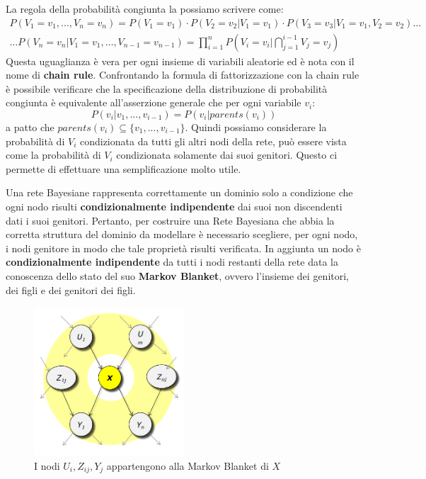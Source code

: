 La regola della probabilità congiunta la possiamo scrivere come:
\begin{equation*}
    \begin{aligned}
        P(V_1= v_1,...,V_n = v_n) = P(V_1 = v_1) \cdot P(V_2 = v_2|V_1 = v_1)
        \cdot P(V_3 = v_3|V_1 = v_1,V_2 = v_2) \dots \\
        \dots P(V_n = v_n|V_1 = v_1, \dots,V_{n-1}=v_{n-1}) = \prod_{i=1}^{n}
        P(V_i = v_i| \bigcap_{j = 1}^{i - 1} V_j= v_j)
    \end{aligned}
\end{equation*}
Questa uguaglianza è vera per ogni insieme di variabili aleatorie ed è nota con
il nome di \textbf{chain rule}. Confrontando la formula di fattorizzazione con
la chain rule è possibile verificare che la specificazione della distribuzione
di probabilità congiunta è equivalente all'asserzione generale che per ogni
variabile $v_i$:
\begin{equation}
    P(v_i|v_1,...,v_{i-1}) = P(v_i|parents(v_i))
\end{equation}
a patto che $parents(v_i) \subseteq \{v_1,...,v_{i-1}\}$. Quindi possiamo
considerare la probabilità di $V_i$ condizionata da tutti gli altri nodi della
rete, può essere vista come la probabilità di $V_i$ condizionata solamente dai
suoi genitori. Questo ci permette di effettuare una semplificazione molto utile.

Una rete Bayesiane rappresenta correttamente un dominio solo a condizione che ogni
nodo risulti \textbf{condizionalmente indipendente} dai suoi non discendenti
dati i suoi genitori. Pertanto, per costruire una Rete Bayesiana che abbia la
corretta struttura del dominio da modellare è necessario scegliere, per ogni nodo,
i nodi genitore in modo che tale proprietà risulti verificata. In aggiunta un nodo
è \textbf{condizionalmente indipendente} da tutti i nodi restanti della rete data
la conoscenza dello stato del suo \textbf{Markov Blanket}, ovvero l'insieme dei
genitori, dei figli e dei genitori dei figli.
\begin{figure}[!ht]
    \centering
    \includegraphics[width=0.5\textwidth]{./img/Reti/MarkovBlanket.png}
    \caption{I nodi $U_i, Z_{ij}, Y_j$ appartengono alla Markov Blanket di $X$}
    \label{fig:MarkovBlanket}
\end{figure}

